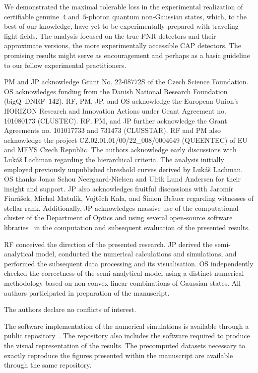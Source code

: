 \documentclass{optica-article}
\begin{document}
We demonstrated the maximal tolerable loss in the experimental realization of certifiable genuine~$4$ and~$5$-photon quantum non-Gaussian states, which, to the best of our knowledge, have yet to be experimentally prepared with traveling light fields. The analysis focused on the true PNR detectors and their approximate versions, the more experimentally accessible CAP detectors. The promising results might serve as encouragement and perhaps as a basic guideline to our fellow experimental practitioners.

%

\FloatBarrier
\begin{backmatter}

PM and JP acknowledge Grant No. 22-08772S of the Czech Science Foundation.
OS acknowledges funding from the Danish National Research Foundation (bigQ~DNRF~142).
RF, PM, JP, and OS acknowledge the European Union's HORIZON Research and Innovation Actions under Grant Agreement no. 101080173 (CLUSTEC).
RF, PM, and JP further acknowledge the Grant Agreements no. 101017733 and 731473 (CLUSSTAR).
RF and PM also acknowledge the project \mbox{CZ.02.01.01/00/22\_008/0004649} (QUEENTEC) of EU and MEYS Czech Republic. 
%
The authors acknowledge early discussions with Luk\'{a}\v{s} Lachman regarding the hierarchical criteria. The analysis initially employed previously unpublished threshold curves derived by Luk\'{a}\v{s} Lachman. 
%
OS thanks Jonas Schou Neergaard-Nielsen and Ulrik Lund Andersen for their insight and support. 
%
JP also acknowledges fruitful discussions with Jarom\'{i}r Fiur\'{a}\v{s}ek, Michal Matul\'{i}k, Vojt\v{e}ch Kala, and \v{S}imon Br\"{a}uer regarding witnesses of stellar rank. 
%
Additionally, JP acknowledges massive use of the computational cluster of the Department of Optics and using several open-source software libraries~\cite{hunter2007,harris2020,virtanen2020,dalcin2021} in the computation and subsequent evaluation of the presented results.

RF conceived the direction of the presented research. JP derived the semi-analytical model, conducted the numerical calculations and simulations, and performed the subsequent data processing and its visualisation. OS independently checked the correctness of the semi-analytical model using a distinct numerical methodology based on non-convex linear combinations of Gaussian states. All authors participated in preparation of the manuscript.


The authors declare no conflicts of interest.

The software implementation of the numerical simulations is available through a public repository~\cite{source}. The repository also includes the software required to produce the visual representation of the results. The precomputed datasets necessary to exactly reproduce the figures presented within the manuscript are available through the same repository.

\end{backmatter}

%


\end{document}
